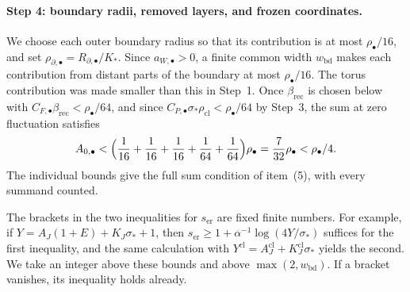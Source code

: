 \paragraph{Step 4: boundary radii, removed layers, and frozen coordinates.}
We choose each outer boundary radius so that its contribution is at most $\rho_\bullet/16$, and set $\rho_{\partial,\bullet}=R_{\partial,\bullet}/K_*$. Since $a_{W,\bullet}>0$, a finite common width $w_{\mathrm{bd}}$ makes each contribution from distant parts of the boundary at most $\rho_\bullet/16$. The torus contribution was made smaller than this in Step~1. Once $\beta_{\mathrm{rec}}$ is chosen below with $C_{F,\bullet}\beta_{\mathrm{rec}}<\rho_\bullet/64$, and since $C_{P,\bullet}\sigma_*\rho_{\mathrm{cl}}<\rho_\bullet/64$ by Step~3, the sum at zero fluctuation satisfies
\begin{equation}\label{ch20:eq:zero-white-sum}
 A_{0,\bullet}<\Bigl(\frac1{16}+\frac1{16}+\frac1{16}+\frac1{64}+\frac1{64}\Bigr)\rho_\bullet=\frac7{32}\rho_\bullet<\rho_\bullet/4.
\end{equation}
The individual bounds give the full sum condition of item~(5), with every summand counted.

The brackets in the two inequalities for $s_{\mathrm{er}}$ are fixed finite numbers. For example, if $Y=A_J(1+E)+K_J\sigma_*+1$, then $s_{\mathrm{er}}\ge1+\alpha^{-1}\log(4Y/\sigma_*)$ suffices for the first inequality, and the same calculation with $Y^{\mathrm{cl}}=A_J^{\mathrm{cl}}+K_J^{\mathrm{cl}}\sigma_*$ yields the second. We take an integer above these bounds and above $\max(2,w_{\mathrm{bd}})$. If a bracket vanishes, its inequality holds already.

